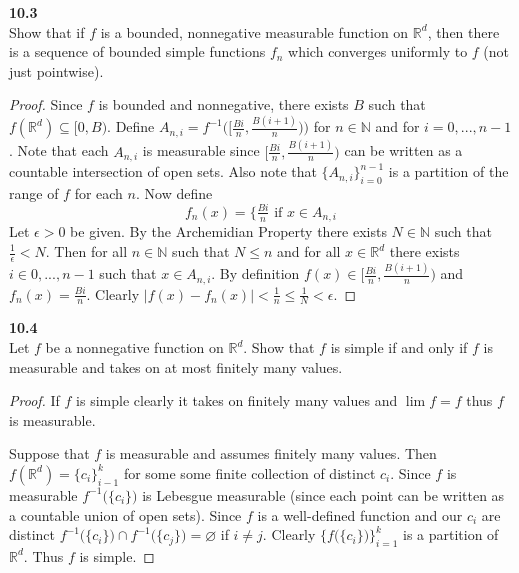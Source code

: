 \documentclass[12pt]{article}
\newcommand{\problem}[1]{\hspace{-4 ex} \large \textbf{#1}\\}
\let\emptyset\varnothing
\begin{document}
\problem{10.3} Show that if $f$ is a bounded, nonnegative measurable function on $\mathbb{R}^d$, then there is a sequence of bounded simple functions $f_n$ which converges uniformly to $f$ (not just pointwise).

	\begin{proof}
		Since $f$ is bounded and nonnegative, there exists $B$ such that \\$f(\mathbb{R}^d) \subseteq [0,B)$. Define $A_{n,i} = f^{-1}\Big( \big[\tfrac{Bi}{n}, \tfrac{B(i+1)}{n}\big)\Big)$ for $n \in \mathbb{N}$ and for $i=0,...,n-1$. Note that each $A_{n,i}$ is measurable since $\big[\tfrac{Bi}{n}, \tfrac{B(i+1)}{n}\big)$ can be written as a countable intersection of open sets. Also note that $\{A_{n,i}\}_{i=0}^{n-1}$ is a partition of the range of $f$ for each $n$. Now define 
		$$f_n(x) = \Big\{\tfrac{Bi}{n} \text{ if }x\in A_{n,i}$$
		Let $\epsilon > 0$ be given. By the Archemidian Property there exists $N \in \mathbb{N}$ such that $\tfrac{1}{\epsilon} < N$. Then for all $n\in \mathbb{N}$ such that $N \leq n$ and for all $x \in \mathbb{R}^d$ there exists $i \in {0,...,n-1}$ such that $x \in A_{n,i}$. By definition $f(x) \in \big[\tfrac{Bi}{n}, \tfrac{B(i+1)}{n}\big)$ and $f_n(x) = \tfrac{Bi}{n}$. Clearly
		$\vert f(x) - f_n(x) \vert < \tfrac{1}{n} \leq \tfrac{1}{N} < \epsilon$.
	\end{proof}

\problem{10.4} Let $f$ be a nonnegative function on $\mathbb{R}^d$. Show that $f$ is simple if and only if $f$ is measurable and takes on at most finitely many values.

	\begin{proof}
		If $f$ is simple clearly it takes on finitely many values and $\lim f = f$ thus $f$ is measurable. \bigbreak
		
		Suppose that $f$ is measurable and assumes finitely many values. 
		Then $f(\mathbb{R}^d) = \{c_i\}_{i-1}^k$ for some some finite collection of distinct $c_i$. 
		Since $f$ is measurable $f^{-1}\big(\{c_i\}\big)$ is Lebesgue measurable (since each point can be written as a countable union of open sets). 
		Since $f$ is a well-defined function and our $c_i$ are distinct $f^{-1}\big(\{c_i\}\big) \cap f^{-1}\big(\{c_j\}\big) = \emptyset $ if $i \neq j$.
		Clearly $\Big \{f \big(\{c_i\} \big) \Big\}_{i=1}^k$ is a partition of $\mathbb{R}^d$. Thus $f$ is simple. 
	\end{proof}
\end{document}

